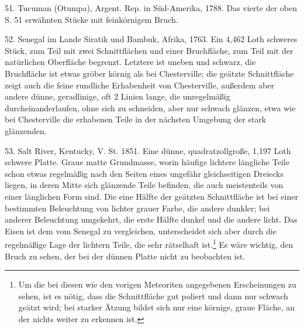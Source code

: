 \documentclass[a4paper, 11pt, oneside]{article}
\begin{document}
51. Tucuman (Otumpa), Argent. Rep. in Süd-Amerika, 1788. Das vierte der oben S. 51 erwähnten Stücke mit feinkörnigem Bruch.

52. Senegal im Lande Siratik und Bambuk, Afrika, 1763. Ein 4,462 Loth schweres Stück, zum Teil mit zwei Schnittflächen und einer Bruchfläche, zum Teil mit der natürlichen Oberfläche begrenzt. Letztere ist uneben und schwarz, die Bruchfläche ist etwas gröber körnig als bei Chesterville; die geätzte Schnittfläche zeigt auch die feine rundliche Erhabenheit von Chesterville, außerdem aber andere dünne, geradlinige, oft 2 Linien lange, die unregelmäßig durcheinanderlaufen, ohne sich zu schneiden, aber nur schwach glänzen, etwa wie bei Chesterville die erhabenen Teile in der nächsten Umgebung der stark glänzenden.

53. Salt River, Kentucky, V. St. 1851. Eine dünne, quadratzollgroße, 1,197 Loth schwere Platte. Graue matte Grundmasse, worin häufige lichtere längliche Teile schon etwas regelmäßig nach den Seiten eines ungefähr gleichseitigen Dreiecks liegen, in deren Mitte sich glänzende Teile befinden, die auch meistenteils von einer länglichen Form sind. Die eine Hälfte der geätzten Schnittfläche ist bei einer bestimmten Beleuchtung von lichter grauer Farbe, die andere dunkler; bei anderer Beleuchtung umgekehrt, die erste Hälfte dunkel und die andere licht. Das Eisen ist dem vom Senegal zu vergleichen, unterscheidet sich aber durch die regelmäßige Lage der lichtern Teile, die sehr rätselhaft ist.\footnote{Um die bei diesen wie den vorigen Meteoriten angegebenen Erscheinungen zu sehen, ist es nötig, dass die Schnittfläche gut poliert und dann nur schwach geätzt wird; bei starker Ätzung bildet sich nur eine körnige, graue Fläche, an der nichts weiter zu erkennen ist.} Es wäre wichtig, den Bruch zu sehen, der bei der dünnen Platte nicht zu beobachten ist.
\end{document}
